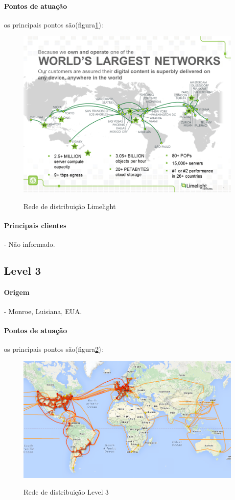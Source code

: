 \paragraph{Pontos de atua\c{c}\~ao}os principais pontos s\~ao(figura\ref{figura:limelight_map}):
\begin{figure}[H]
\caption{Rede de distribui\c{c}\~ao Limelight}
\includegraphics[width=14cm]{Figuras/limelight_map.png} 
\label{figura:limelight_map}
\end{figure}
\paragraph{Principais clientes}- N\~ao informado.
\subsection{Level 3}
\paragraph{Origem}- Monroe, Luisiana, EUA. 
\paragraph{Pontos de atua\c{c}\~ao}os principais pontos s\~ao(figura\ref{figura:level3_map}):
\begin{figure}[H]
\caption{Rede de distribui\c{c}\~ao Level 3}
\includegraphics[width=14cm]{Figuras/level3_map.png} 
\label{figura:level3_map}
\end{figure}
